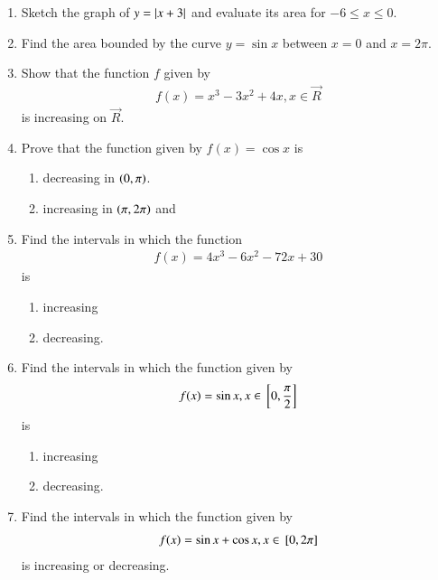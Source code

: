 \begin{enumerate}[label=\arabic*.,ref=\thesubsection.\theenumi]
\item Sketch the graph of $y = \left\vert x+3\right\vert$ and evaluate its area for $-6 \le x \le 0$.
\item Find the area bounded by the curve $y = \sin x$ between $x = 0$ and $x =2\pi$.
\item Show that the function $f$ given by 
\begin{align}
f(x) = x^3 - 3x^2 + 4x , x \in \vec{R}
\end{align}
%
is increasing on $\vec{R}$.
\item Prove that the function given by $f(x) = \cos x$ is
\begin{enumerate}
\item decreasing in $\left(0,\pi\right)$.
\item increasing in $\left(\pi,2\pi\right)$ and 
\end{enumerate}
%
\item Find the intervals in which the function 
\begin{align}
f(x)  = 4x^3-6x^2-72x+30
\end{align}
%
is 
\begin{enumerate}
\item increasing
\item decreasing.
\end{enumerate}
%
\item Find the intervals in which the function given by 
\begin{align}
f(x)  = \sin x, x \in {}\left[0,\frac{\pi}{2}\right]
\end{align}
%
is 
\begin{enumerate}
\item increasing
\item decreasing.
\end{enumerate}
%
\item Find the intervals in which the function given by 
\begin{align}
f(x)  = \sin x + \cos x, x \in {}\left[0,2\pi\right]
\end{align}
%
is increasing or decreasing.

\end{enumerate}
